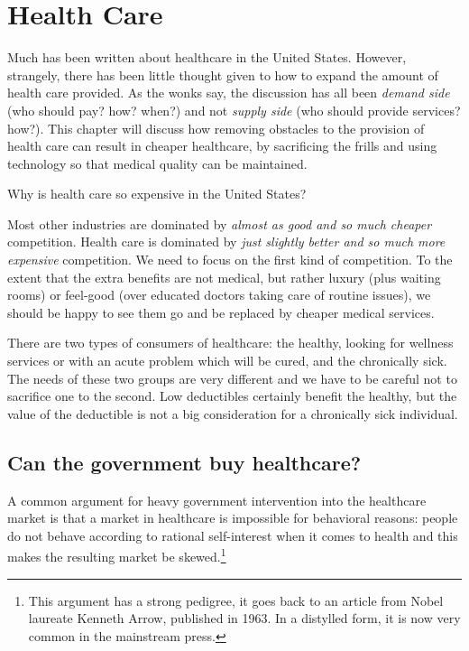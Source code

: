 \chapter{Health Care}
\label{chpt:health}

Much has been written about healthcare in the United States. However,
strangely, there has been little thought given to how to expand the amount of
health care provided. As the wonks say, the discussion has all been
\emph{demand side} (who should pay? how? when?) and not \emph{supply side} (who
should provide services? how?). This chapter will discuss how removing
obstacles to the provision of health care can result in cheaper healthcare, by
sacrificing the frills and using technology so that medical quality can be
maintained.

Why is health care so expensive in the United States?

Most other industries are dominated by \emph{almost as good and so much
cheaper} competition. Health care is dominated by \emph{just slightly better
and so much more expensive} competition. We need to focus on the first kind of
competition. To the extent that the extra benefits are not medical, but rather
luxury (plus waiting rooms) or feel-good (over educated doctors taking care of
routine issues), we should be happy to see them go and be replaced by cheaper
medical services.

There are two types of consumers of healthcare: the healthy, looking for
wellness services or with an acute problem which will be cured, and the
chronically sick. The needs of these two groups are very different and we have
to be careful not to sacrifice one to the second. Low deductibles certainly
benefit the healthy, but the value of the deductible is not a big consideration
for a chronically sick individual.

\section{Can the government buy healthcare?}

A common argument for heavy government intervention into the healthcare market
is that a market in healthcare is impossible for behavioral reasons: people do
not behave according to rational self-interest when it comes to health and this
makes the resulting market be skewed.\footnote{This argument has a strong
pedigree, it goes back to an article from Nobel laureate Kenneth Arrow,
published in 1963. In a distylled form, it is now very common in the mainstream
press.}

